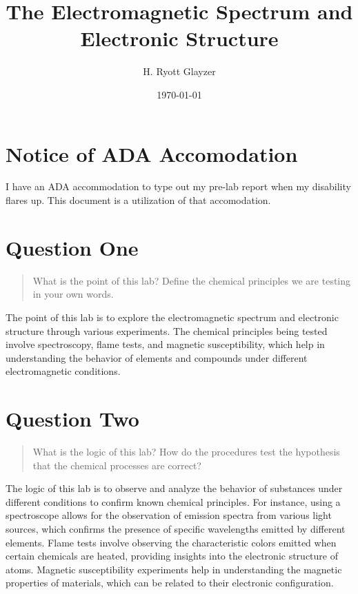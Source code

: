 \documentclass[11pt, letterpaper]{article}
\begin{document}


\title{The Electromagnetic Spectrum and Electronic Structure}
\author{H. Ryott Glayzer}
\date{\today}


\maketitle


\section*{Notice of ADA Accomodation}
I have an ADA accommodation to type out my pre-lab report when my disability flares up.
This document is a utilization of that accomodation.

\section{Question One}
\begin{quote}
    What is the point of this lab? Define the chemical principles we are testing in your own words.
\end{quote}

The point of this lab is to explore the electromagnetic spectrum and electronic structure 
through various experiments. The chemical principles being tested involve spectroscopy, 
flame tests, and magnetic susceptibility, which help in understanding the behavior of elements 
and compounds under different electromagnetic conditions.


\section{Question Two}
\begin{quote}
    What is the logic of this lab? How do the procedures test the hypothesis that the chemical 
    processes are correct?
\end{quote}

The logic of this lab is to observe and analyze the behavior of substances under different conditions
to confirm known chemical principles. For instance, using a spectroscope allows
for the observation of emission spectra from various light sources, which
confirms the presence of specific wavelengths emitted by different elements.
Flame tests involve observing the characteristic colors emitted when certain
chemicals are heated, providing insights into the electronic structure of atoms.
Magnetic susceptibility experiments help in understanding the magnetic properties
of materials, which can be related to their electronic configuration.
\end{document}
